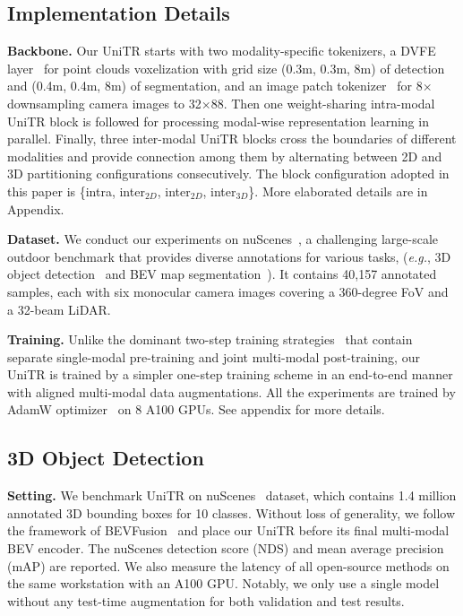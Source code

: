 \documentclass[10pt,twocolumn,letterpaper]{article}
\begin{document}
\subsection{Implementation Details}
\noindent \textbf{Backbone.} Our UniTR starts with two modality-specific tokenizers, a DVFE layer~\cite{zhou2020end} for point clouds voxelization with grid size (0.3m, 0.3m, 8m) of detection and (0.4m, 0.4m, 8m) of segmentation, and an image patch tokenizer~\cite{dosovitskiy2020image} for 8$\times$ downsampling camera images to 32$\times$88. Then one weight-sharing intra-modal UniTR block is followed for processing modal-wise representation learning in parallel. Finally, three inter-modal UniTR blocks cross the boundaries of different modalities and provide connection among them by alternating between 2D and 3D partitioning configurations consecutively. The block configuration adopted in this paper is \{intra, inter$_{2D}$, inter$_{2D}$, inter$_{3D}$\}. More elaborated details are in Appendix. 

\noindent \textbf{Dataset.} We conduct our experiments on nuScenes~\cite{caesar2020nuscenes}, a challenging large-scale outdoor benchmark that provides diverse annotations for various tasks, (\emph{e.g.}, 3D object detection~\cite{yin2021cvpr} and BEV map segmentation~\cite{liu2022bevfusion,li2022hdmapnet}). It contains 40,157 annotated samples, each with six monocular camera images covering a 360-degree FoV and a 32-beam LiDAR.

\noindent \textbf{Training.} Unlike the dominant two-step training strategies~\cite{liu2022bevfusion,liang2022bevfusion,bai2022transfusion} that contain separate single-modal pre-training and joint multi-modal post-training, our UniTR is trained by a simpler one-step training scheme in an end-to-end manner with aligned multi-modal data augmentations. All the experiments are trained by AdamW optimizer~\cite{loshchilov2018decoupled} on 8 A100 GPUs. See appendix for more details. 
\subsection{3D Object Detection}
\noindent \textbf{Setting.} We benchmark UniTR on nuScenes~\cite{caesar2020nuscenes} dataset, which contains 1.4 million annotated 3D bounding boxes for 10 classes. Without loss of generality, we follow the framework of BEVFusion~\cite{liu2022bevfusion} and place our UniTR before its final multi-modal BEV encoder. The nuScenes detection score (NDS) and mean average precision (mAP) are reported. We also measure the latency of all open-source methods on the same workstation with an A100 GPU. Notably, we only use a single model without any test-time augmentation for both validation and test results.
\end{document}

